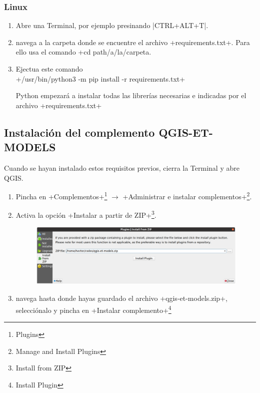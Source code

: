 \documentclass[a4paper,11pt]{article}
\begin{document}
\subsubsection{Linux}
\begin{enumerate}
 \item Abre una Terminal, por ejemplo presinando \cverb|CTRL+ALT+T|.
 
 \item navega a la carpeta donde se encuentre el archivo \cverb+requirements.txt+. Para ello usa el comando \cverb+cd path/a/la/carpeta\+.
 
 \item Ejectua este comando\\\cverb+/usr/bin/python3 -m pip install -r requirements.txt+
 
 Python empezará a instalar todas las librerías necesarias e indicadas por el archivo \cverb+requirements.txt+
\end{enumerate}

\subsection{Instalación del complemento QGIS-ET-MODELS}
Cuando se hayan instalado estos requisitos previos, cierra la Terminal y abre QGIS.

\begin{enumerate}
 \item Pincha en \cverb+Complementos+\footnote{Plugins} $\rightarrow$ \cverb+Administrar e instalar complementos+\footnote{Manage and Install Plugins}.
 
 \item Activa la opción \cverb+Instalar a partir de ZIP+\footnote{Install from ZIP}.
 
 \begin{figure}[H]\centering
  \includegraphics[width=\textwidth]{qgis_plugin_zip}
 \end{figure}

 
 \item navega hasta donde hayas guardado el archivo \cverb+qgis-et-models.zip+, selecciónalo y pincha en \cverb+Instalar complemento+\footnote{Install Plugin}
\end{enumerate}
\end{document}
